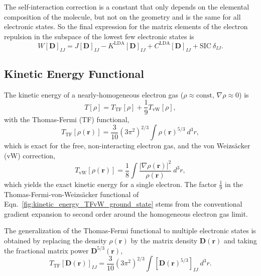 \documentclass[journal=jpclcd,manuscript=letter]{achemso}
\newcommand\m[1]{\mathbf{#1}}
\renewcommand\vec[1]{\mathbf{#1}}
\begin{document}
The self-interaction correction is a constant that only depends on the elemental composition of the molecule, but not
on the geometry and is the same for all electronic states. So the final expression for the matrix elements of the electron repulsion 
in the subspace of the lowest few electronic states is
\begin{equation}
W[\m{D}]_{IJ} = J[\m{D}]_{IJ} - K^{\text{LDA}}[\m{D}]_{IJ} + C^{\text{LDA}}[\m{D}]_{IJ} + \text{SIC} ~ \delta_{IJ}. \label{eqn:electron_repulsion_msdft}
\end{equation}

\subsection{Kinetic Energy Functional}
The kinetic energy of a nearly-homogeneous electron gas ($\rho \approx \text{const}$, $\nabla \rho \approx 0$) is
\begin{equation}
T[\rho] = T_{\text{TF}}[\rho] + \frac{1}{9} T_{\text{vW}}[\rho], \label{fig:kinetic_energy_TFvW_ground_state}
\end{equation}
with the 
Thomas-Fermi (TF) functional,
\begin{equation}
T_{\text{TF}}[\rho(\vec{r})] = \frac{3}{10} (3 \pi^2)^{2/3} \int \rho(\vec{r})^{5/3} ~ d^3\!r,
\end{equation}
which is exact for the free, non-interacting electron gas, and the von Weizs\"{a}cker (vW) correction,
\begin{equation}
T_{\text{vW}}[\rho(\vec{r})] = \frac{1}{8} \int \frac{ \vert \nabla \rho(\vec{r}) \vert^2}{\rho(\vec{r})} ~ d^3\!r, \label{eqn:Tvw_ground_state}
\end{equation}
which yields the exact kinetic energy for a single electron.
The factor $\frac{1}{9}$ in the Thomas-Fermi-von-Weizs\"{a}cker functional of Eqn.~\ref{fig:kinetic_energy_TFvW_ground_state}
stems from the conventional gradient expansion to second order around the homogeneous electron gas limit. \cite[section 6.7]{ParrYangBook}

The generalization of the Thomas-Fermi functional to multiple
electronic states is obtained by
replacing the density $\rho(\vec{r})$ by the matrix density $\m{D}(\vec{r})$ and taking the fractional matrix power $\m{D}^{5/3}(\vec{r})$,
\begin{equation}
  T_{\text{TF}}[\m{D}(\vec{r})]_{IJ} = \frac{3}{10} (3 \pi^2)^{2/3} \int \left[ \m{D}(\vec{r})^{5/3} \right]_{IJ} ~ d^3\!r.
\end{equation}
\end{document}

